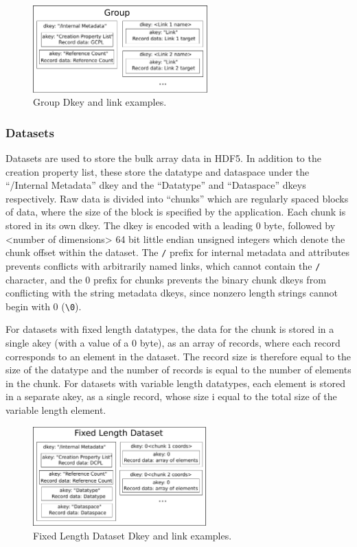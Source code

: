 \begin{figure}
\includegraphics[width=0.6\textwidth]{pics/group_figure}
\caption{Group Dkey and link examples.}
\label{fig:group}
\end{figure}

\subsubsection{Datasets}

Datasets are used to store the bulk array data in HDF5. In addition to the creation property list, these store the datatype and dataspace under the ``/Internal Metadata'' dkey and the ``Datatype'' and ``Dataspace'' dkeys respectively. Raw data is divided into ``chunks'' which are regularly spaced blocks of data, where the size of the block is specified by the application. Each chunk is stored in its own dkey. The dkey is encoded with a leading 0 byte, followed by <number of dimensions> 64 bit little endian unsigned integers which denote the chunk offset within the dataset. The \verb+/+ prefix for internal metadata and attributes prevents conflicts with arbitrarily named links, which cannot contain the \verb+/+ character, and the 0 prefix for chunks prevents the binary chunk dkeys from conflicting with the string metadata dkeys, since nonzero length strings cannot begin with 0 (\verb+\0+).

For datasets with fixed length datatypes, the data for the chunk is stored in a single akey (with a value of a 0 byte), as an array of records, where each record corresponds to an element in the dataset. The record size is therefore equal to the size of the datatype and the number of records is equal to the number of elements in the chunk. For datasets with variable length datatypes, each element is stored in a separate akey, as a single record, whose size i equal to the total size of the variable length element.

\begin{figure}
\includegraphics[width=0.6\textwidth]{pics/dataset_figure}
\caption{Fixed Length Dataset Dkey and link examples.}
\label{fig:dataset}
\end{figure}


